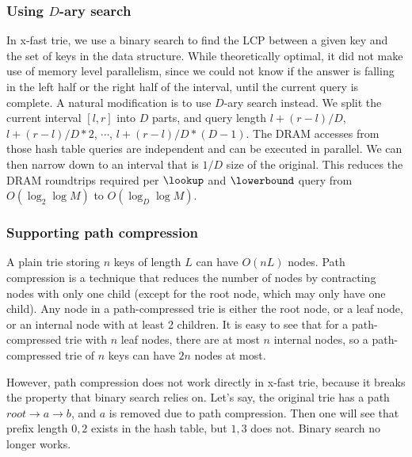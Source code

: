\documentclass[11pt, usletter]{article}
\begin{document}
\subsubsection*{Using $D$-ary search}

In x-fast trie, we use a binary search to find the LCP between a given key and the set of keys in the data structure.
While theoretically optimal, it did not make use of memory level parallelism, 
since we could not know if the answer is falling in the left half or the right half of the interval, 
until the current query is complete. 
A natural modification is to use $D$-ary search instead. 
We split the current interval $[l,r]$ into $D$ parts, 
and query length $l+(r-l)/D$, $l+(r-l)/D*2$, $\cdots$, $l+(r-l)/D*(D-1)$.
The DRAM accesses from those hash table queries are independent and can be executed in parallel.
We can then narrow down to an interval that is $1/D$ size of the original.
This reduces the DRAM roundtrips required per $\lookup$ and $\lowerbound$ query from $O(\log_2\log M)$ to $O(\log_D\log M)$.

\subsubsection*{Supporting path compression}

A plain trie storing $n$ keys of length $L$ can have $O(nL)$ nodes.
Path compression is a technique that reduces the number of nodes by contracting nodes with only one child 
(except for the root node, which may only have one child). 
Any node in a path-compressed trie is either the root node, or a leaf node, or an internal node with at least 2 children. 
It is easy to see that for a path-compressed trie with $n$ leaf nodes, there are at most $n$ internal nodes, 
so a path-compressed trie of $n$ keys can have $2n$ nodes at most.

However, path compression does not work directly in x-fast trie, 
because it breaks the property that binary search relies on. 
Let's say, the original trie has a path $root\rightarrow a\rightarrow b$, 
and $a$ is removed due to path compression. 
Then one will see that prefix length $0,2$ exists in the hash table, 
but $1,3$ does not. Binary search no longer works.
\end{document}
